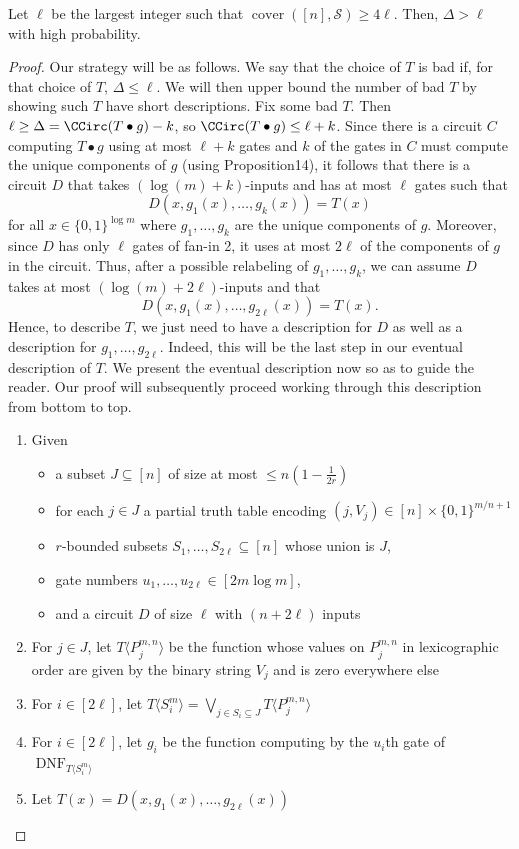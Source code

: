 \begin{ntlemma}
Let $\ell$ be the largest integer such that $\operatorname{cover}([n],\mathcal S)\geq4\ell$. Then, $\Delta>\ell$ with high probability.
\end{ntlemma}
\begin{proof}
Our strategy will be as follows. We say that the choice of $T$ is bad if, for that choice of $T$, $\Delta\leq\ell$. We will then upper bound the number of bad $T$ by showing such $T$ have short descriptions.
Fix some bad $T$. Then $\ell\geq\Delta=\CCirc(T\bullet g)-k$, so $\CCirc(T\bullet g)\leq\ell+k$. Since there is a circuit $C$ computing $T\bullet g$ using at most $\ell+k$ gates and $k$ of the gates in $C$ must compute the unique components of $g$ (using Proposition14), it follows that there is a circuit $D$ that takes $(\log(m)+k)$-inputs and has at most $\ell$ gates such that
\[D(x,g_1(x),\ldots,g_k(x))=T(x)\]
for all $x\in\{0,1\}^{\log m}$ where $g_1,\ldots,g_k$ are the unique components of $g$. Moreover, since $D$ has only $\ell$ gates of fan-in 2, it uses at most $2\ell$ of the components of $g$ in the circuit. Thus, after a possible relabeling of $g_1,\ldots,g_k$, we can assume $D$ takes at most $(\log(m)+2\ell)$-inputs and that
\[D(x,g_1(x),\ldots,g_{2\ell}(x))=T(x).\]
Hence, to describe $T$, we just need to have a description for $D$ as well as a description for $g_1,\ldots,g_{2\ell}$. Indeed, this will be the last step in our eventual description of $T$. We present the eventual description now so as to guide the reader. Our proof will subsequently proceed working through this description from bottom to top.
\begin{enumerate}
\item Given
\begin{itemize}
\item a subset $J\subseteq[n]$ of size at most $\leq n(1-\frac1{2r})$
\item for each $j\in J$ a partial truth table encoding $(j,V_j)\in[n]\times\{0,1\}^{m/n+1}$
\item $r$-bounded subsets $S_1,\ldots,S_{2\ell}\subseteq[n]$ whose union is $J$,
\item gate numbers $u_1,\ldots,u_{2\ell}\in[2m\log m]$,
\item and a circuit $D$ of size $\ell$ with $(n+2\ell)$ inputs
\end{itemize}
\item For $j\in J$, let $T\langle P_j^{m,n}\rangle$ be the function whose values on $P_j^{m,n}$ in lexicographic order are given by the binary string $V_j$ and is zero everywhere else
\item For $i\in[2\ell]$, let $T\langle S_i^m\rangle=\bigvee_{j\in S_i\subseteq J}T\langle P_j^{m,n}\rangle$
\item For $i\in[2\ell]$, let $g_i$ be the function computing by the $u_i$th gate of $\operatorname{DNF}_{T\langle S_i^m\rangle}$
\item Let $T(x)=D(x,g_1(x),\ldots,g_{2\ell}(x))$
\end{enumerate}

\end{proof}
